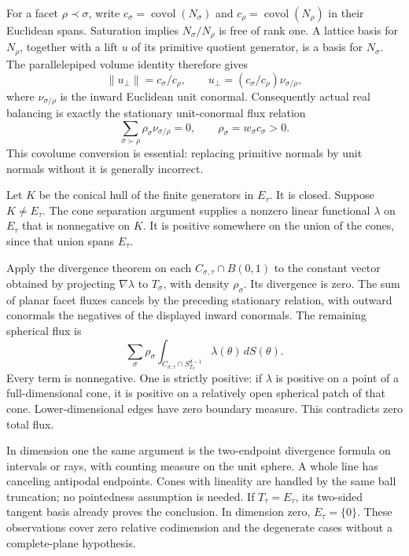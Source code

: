 \documentclass[
  11pt,
]{article}
\begin{document}
For a facet \(\rho\prec\sigma\), write
\(c_\sigma=\operatorname{covol}(N_\sigma)\) and
\(c_\rho=\operatorname{covol}(N_\rho)\) in their Euclidean spans.
Saturation implies \(N_\sigma/N_\rho\) is free of rank one. A lattice
basis for \(N_\rho\), together with a lift \(u\) of its primitive
quotient generator, is a basis for \(N_\sigma\). The parallelepiped
volume identity therefore gives \[ \|u_\perp\|=c_\sigma/c_\rho,
\qquad u_\perp=(c_\sigma/c_\rho)\nu_{\sigma/\rho}, \] where
\(\nu_{\sigma/\rho}\) is the inward Euclidean unit conormal.
Consequently actual real balancing is exactly the stationary
unit-conormal flux relation \[
\sum_{\sigma\succ\rho}\rho_\sigma\nu_{\sigma/\rho}=0,
\qquad \rho_\sigma=w_\sigma c_\sigma>0.
\] This covolume conversion is essential: replacing primitive normals by
unit normals without it is generally incorrect.

Let \(K\) be the conical hull of the finite generators in \(E_\tau\). It
is closed. Suppose \(K\ne E_\tau\). The cone separation argument
supplies a nonzero linear functional \(\lambda\) on \(E_\tau\) that is
nonnegative on \(K\). It is positive somewhere on the union of the
cones, since that union spans \(E_\tau\).

Apply the divergence theorem on each \(C_{\sigma,\tau}\cap B(0,1)\) to
the constant vector obtained by projecting \(\nabla\lambda\) to
\(T_\sigma\), with density \(\rho_\sigma\). Its divergence is zero. The
sum of planar facet fluxes cancels by the preceding stationary relation,
with outward conormals the negatives of the displayed inward conormals.
The remaining spherical flux is \[
\sum_\sigma \rho_\sigma
\int_{C_{\sigma,\tau}\cap S^{d-1}_{T_\sigma}}\lambda(\theta)\,dS(\theta).
\] Every term is nonnegative. One is strictly positive: if \(\lambda\)
is positive on a point of a full-dimensional cone, it is positive on a
relatively open spherical patch of that cone. Lower-dimensional edges
have zero boundary measure. This contradicts zero total flux.

In dimension one the same argument is the two-endpoint divergence
formula on intervals or rays, with counting measure on the unit sphere.
A whole line has canceling antipodal endpoints. Cones with lineality are
handled by the same ball truncation; no pointedness assumption is
needed. If \(T_\tau=E_\tau\), its two-sided tangent basis already proves
the conclusion. In dimension zero, \(E_\tau=\{0\}\). These observations
cover zero relative codimension and the degenerate cases without a
complete-plane hypothesis.
\end{document}
